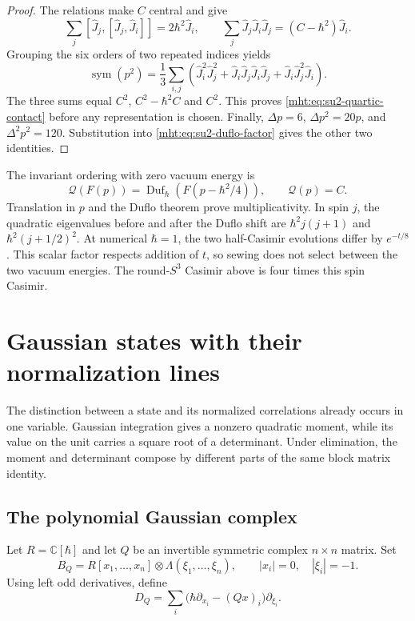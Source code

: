 \begin{proof}
The relations make $C$ central and give
\[
 \sum_j[\widehat J_j,[\widehat J_j,\widehat J_i]]
       =2\hbar^2\widehat J_i,
 \qquad
 \sum_j\widehat J_j\widehat J_i\widehat J_j
       =(C-\hbar^2)\widehat J_i.
\]
Grouping the six orders of two repeated indices yields
\[
 \operatorname{sym}(p^2)=\frac13\sum_{i,j}
 \left(\widehat J_i^2\widehat J_j^2
       +\widehat J_i\widehat J_j\widehat J_i\widehat J_j
       +\widehat J_i\widehat J_j^2\widehat J_i\right).
\]
The three sums equal $C^2$, $C^2-\hbar^2C$ and $C^2$.
This proves \eqref{mht:eq:su2-quartic-contact} before any
representation is chosen. Finally,
$\Delta p=6$, $\Delta p^2=20p$, and $\Delta^2p^2=120$.
Substitution into \eqref{mht:eq:su2-duflo-factor} gives
the other two identities.
\end{proof}

The invariant ordering with zero vacuum energy is
\[
 \mathcal Q(F(p))=\operatorname{Duf}_\hbar(F(p-\hbar^2/4)),
 \qquad \mathcal Q(p)=C.
\]
Translation in $p$ and the Duflo theorem prove multiplicativity.
In spin $j$, the quadratic eigenvalues before and after the
Duflo shift are $\hbar^2j(j+1)$ and $\hbar^2(j+1/2)^2$.
At numerical $\hbar=1$, the two half-Casimir evolutions differ
by $e^{-t/8}$. This scalar factor respects addition of $t$,
so sewing does not select between the two vacuum energies.
The round-$S^3$ Casimir above is four times this spin Casimir.

\section{Gaussian states with their normalization lines}

The distinction between a state and its normalized correlations
already occurs in one variable. Gaussian integration gives a
nonzero quadratic moment, while its value on the unit carries
a square root of a determinant. Under elimination, the moment
and determinant compose by different parts of the same block
matrix identity.

\subsection{The polynomial Gaussian complex}

Let $R=\mathbb C[\hbar]$ and let $Q$ be an invertible symmetric
complex $n\times n$ matrix. Set
\[
 B_Q=R[x_1,\ldots,x_n]\otimes\Lambda(\xi_1,\ldots,\xi_n),
 \qquad |x_i|=0,\quad |\xi_i|=-1.
\]
Using left odd derivatives, define
\begin{equation}\label{mht:eq:gaussian-state-differential}
 D_Q=\sum_i\bigl(\hbar\partial_{x_i}-(Qx)_i\bigr)
                                                   \partial_{\xi_i}.
\end{equation}

